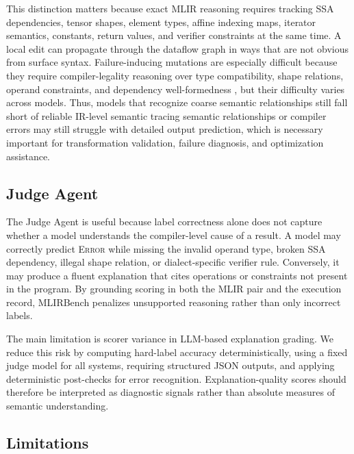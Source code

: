 \documentclass[sigplan,screen,review,anonymous]{acmart}
\providecommand{\DIFadd}[1]{{\protect\color{blue} \sf #1}} %
\providecommand{\DIFdel}[1]{{\protect\color{red} \scriptsize #1}} %
\providecommand{\DIFaddbegin}{} %
\providecommand{\DIFaddend}{} %
\providecommand{\DIFdelbegin}{} %
\providecommand{\DIFdelend}{} %
\begin{document}
This distinction matters because exact MLIR reasoning requires
tracking SSA dependencies, tensor shapes, element types, affine
indexing maps, iterator semantics, constants, return values, and
verifier constraints at the same time. A local edit can propagate
through the dataflow graph in ways that are not obvious from surface
syntax. Failure-inducing mutations \DIFdelbegin \DIFdel{are especially difficult because they }\DIFdelend require compiler-legality reasoning
over type compatibility, shape relations, operand constraints, and
dependency well-formedness\DIFaddbegin \DIFadd{, but their difficulty varies across models}\DIFaddend .
Thus, models that recognize \DIFdelbegin \DIFdel{coarse semantic relationships still fall short of reliable IR-level semantic tracing}\DIFdelend \DIFaddbegin \DIFadd{semantic relationships or compiler errors
may still struggle with detailed output prediction}\DIFaddend , which is \DIFdelbegin \DIFdel{necessary }\DIFdelend \DIFaddbegin \DIFadd{important
}\DIFaddend for transformation validation, failure diagnosis, and optimization
assistance.

\subsection{Judge Agent}

The Judge Agent is useful because label correctness alone does not capture whether a model understands the compiler-level cause of a result. A model may correctly predict \textsc{Error} while missing the invalid operand type, broken SSA dependency, illegal shape relation, or dialect-specific verifier rule. Conversely, it may produce a fluent explanation that cites operations or constraints not present in the program. By grounding scoring in both the MLIR pair and the execution record, MLIRBench penalizes unsupported reasoning rather than only incorrect labels.

The main limitation is scorer variance in LLM-based explanation grading. We reduce this risk by computing hard-label accuracy deterministically, using a fixed judge model for all systems, requiring structured JSON outputs, and applying deterministic post-checks for error recognition. Explanation-quality scores should therefore be interpreted as diagnostic signals rather than absolute measures of semantic understanding.

\DIFaddbegin \raggedbottom
\DIFaddend \subsection{Limitations}
\end{document}

